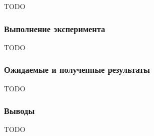 TODO

\subsubsection*{Выполнение эксперимента}

TODO

\subsubsection*{Ожидаемые и полученные результаты}

TODO

\subsubsection*{Выводы}

TODO

\clearpage
\newpage